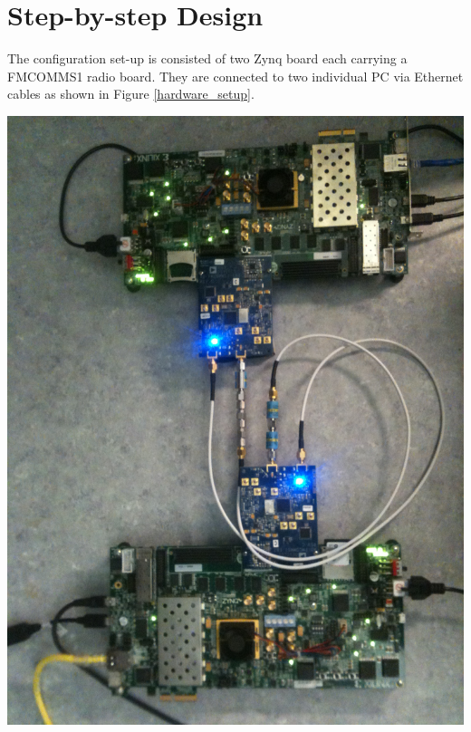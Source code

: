 \section{Step-by-step Design}
The configuration set-up is consisted of two Zynq board each carrying a FMCOMMS1 radio board. They are connected to two individual PC via Ethernet cables as shown in Figure \ref{hardware_setup}.\\

\begin{center}
\includegraphics[width=\textwidth]{content/fig/hardware_setup.JPG}
\label{hardware_setup}
\end{center}


